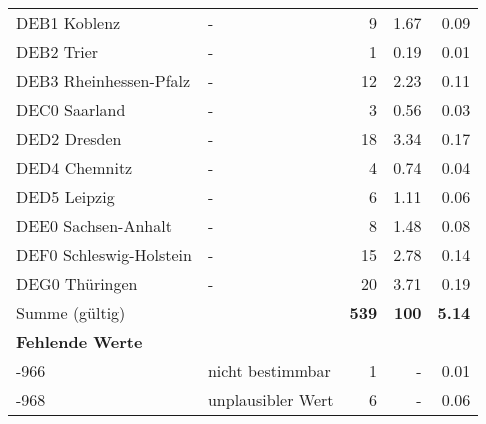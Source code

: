 \begin{longtable}{Xlrrr}
        \multicolumn{1}{X}{DEB1 Koblenz} & - & \num{9} & \num[round-mode=places,round-precision=2]{1.67} & \num[round-mode=places,round-precision=2]{0.09} \\
        \multicolumn{1}{X}{DEB2 Trier} & - & \num{1} & \num[round-mode=places,round-precision=2]{0.19} & \num[round-mode=places,round-precision=2]{0.01} \\
        \multicolumn{1}{X}{DEB3 Rheinhessen-Pfalz} & - & \num{12} & \num[round-mode=places,round-precision=2]{2.23} & \num[round-mode=places,round-precision=2]{0.11} \\
        \multicolumn{1}{X}{DEC0 Saarland} & - & \num{3} & \num[round-mode=places,round-precision=2]{0.56} & \num[round-mode=places,round-precision=2]{0.03} \\
        \multicolumn{1}{X}{DED2 Dresden} & - & \num{18} & \num[round-mode=places,round-precision=2]{3.34} & \num[round-mode=places,round-precision=2]{0.17} \\
        \multicolumn{1}{X}{DED4 Chemnitz} & - & \num{4} & \num[round-mode=places,round-precision=2]{0.74} & \num[round-mode=places,round-precision=2]{0.04} \\
        \multicolumn{1}{X}{DED5 Leipzig} & - & \num{6} & \num[round-mode=places,round-precision=2]{1.11} & \num[round-mode=places,round-precision=2]{0.06} \\
        \multicolumn{1}{X}{DEE0 Sachsen-Anhalt} & - & \num{8} & \num[round-mode=places,round-precision=2]{1.48} & \num[round-mode=places,round-precision=2]{0.08} \\
        \multicolumn{1}{X}{DEF0 Schleswig-Holstein} & - & \num{15} & \num[round-mode=places,round-precision=2]{2.78} & \num[round-mode=places,round-precision=2]{0.14} \\
        \multicolumn{1}{X}{DEG0 Thüringen} & - & \num{20} & \num[round-mode=places,round-precision=2]{3.71} & \num[round-mode=places,round-precision=2]{0.19} \\
     \midrule
      \multicolumn{2}{l}{Summe (gültig)} & \textbf{\num{539}} &
      \textbf{\num{100}} &
         \textbf{\num[round-mode=places,round-precision=2]{5.14}} \\
     \multicolumn{5}{l}{\textbf{Fehlende Werte}}\\
       -966 & nicht bestimmbar & \num{1} & - & \num[round-mode=places,round-precision=2]{0.01} \\

       -968 & unplausibler Wert & \num{6} & - & \num[round-mode=places,round-precision=2]{0.06} \\


\end{longtable}
